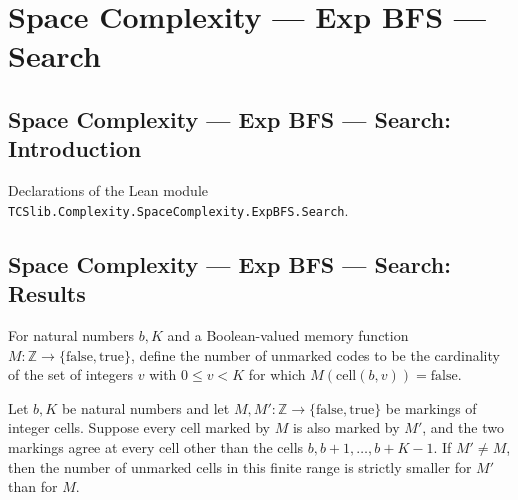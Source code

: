 \section{Space Complexity --- Exp BFS --- Search}
\subsection*{Space Complexity --- Exp BFS --- Search: Introduction}

Declarations of the Lean module \texttt{TCSlib.Complexity.SpaceComplexity.ExpBFS.Search}.

\subsection*{Space Complexity --- Exp BFS --- Search: Results}

\begin{definition}
\label{Complexity.LogProg.ExpBFS.unmarked}
\leanok
{}
For natural numbers $b,K$ and a Boolean-valued memory function $M:\mathbb
Z\to\{\mathrm{false},\mathrm{true}\}$, define the number of unmarked codes to be the
cardinality of the set of integers $v$ with $0\le v<K$ for which
$M(\mathrm{cell}(b,v))=\mathrm{false}$.
\end{definition}

\begin{lemma}
\label{Complexity.LogProg.ExpBFS.unmarked_lt}
\leanok
{}
Let $b,K$ be natural numbers and let $M,M':\mathbb Z\to\{\mathrm{false},\mathrm{true}\}$
be markings of integer cells. Suppose every cell marked by $M$ is also marked by $M'$,
and the two markings agree at every cell other than the cells $b,b+1,\ldots,b+K-1$. If
$M'\ne M$, then the number of unmarked cells in this finite range is strictly smaller
for $M'$ than for $M$.
\end{lemma}

